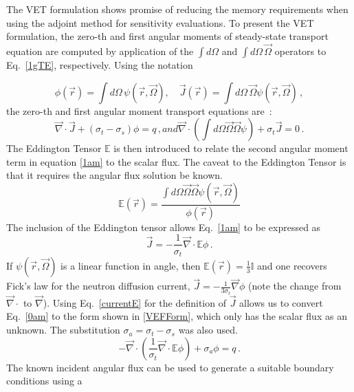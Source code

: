 \documentclass[12pt]{report}
\newcommand{\vr}{\vec{r}}
\newcommand{\vO}{\vec{\Omega}}
\renewcommand{\div}{\vec{\nabla} \cdot}
\newcommand{\grad}{\vec{\nabla}}
\newcommand{\Edd}{\mathbb{E}}
\newcommand{\sigt}{\sigma_t}
\newcommand{\sigs}{\sigma_s}
\newcommand{\siga}{\sigma_a}
\newcommand{\scalSource}{q}
\begin{document}
The VET formulation shows promise of reducing the memory requirements when using the adjoint method for sensitivity evaluations. To present the VET formulation, the zero-th and first angular moments of steady-state transport equation are computed by application of the $\int d \Omega$ and $\int d \Omega \, \vO$ operators to Eq.~\eqref{1gTE}, respectively. Using the notation

\begin{equation}
\label{VETFormStart}
\phi(\vr)=\int d\Omega \, \psi( \vr,\vO )
,\quad
\vec{J}(\vr)= \int d\Omega \, \vO \psi( \vr,\vO ) \,,
\end{equation}
the zero-th and first angular moment transport equations are~: 
%
\begin{subequations}
%
\begin{equation}
\label{0am}
\div \vec{J} + (\sigt-\sigs) \phi = \scalSource \,,
\end{equation}
and
\begin{equation}
\label{1am}
\div \left(  \int d\Omega \vO \vO \psi \right) + \sigt \vec{J} = 0 \,.
\end{equation}
%
\end{subequations}
The Eddington Tensor $\Edd$ is then introduced to relate the second angular moment term in equation \eqref{1am} to the scalar flux. The caveat to the Eddington Tensor is that it requires the angular flux solution be known.
\begin{equation}
\label{EddDef}
\Edd(\vr)=\frac{\int d\Omega \vO \vO \psi(\vr,\vO)}{\phi(\vr)}
\end{equation}
The inclusion of the Eddington tensor allows Eq.~\eqref{1am} to be expressed as 
\begin{equation}
\label{currentE}
\vec{J} = - \frac{1}{\sigt} \div \Edd \phi \,.
\end{equation}
If $\psi(\vr,\vO)$ is a linear function in angle, then $\Edd(\vr)=\tfrac{1}{3}\mathbb{I}$ and one recovers Fick's law for the neutron diffusion current, $\vec{J} = - \frac{1}{3\sigt} \grad \phi$ (note the change from $\div$ to $\grad$). Using Eq.~\eqref{currentE} for the definition of $\vec{J}$ allows us to convert Eq.~\eqref{0am} to the form shown in \eqref{VEFForm}, which only has the scalar flux as an unknown. The substitution $\siga = \sigt-\sigs$ was also used.
\begin{equation}
\label{VEFForm}
- \div \left( \frac{1}{\sigt}\div \Edd \phi \right) + \siga \phi = \scalSource \,.
\end{equation}
The known incident angular flux can be used to generate a suitable boundary conditions using a 
\end{document}
